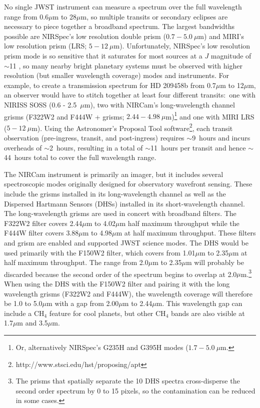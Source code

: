 \documentclass[iop]{emulateapj}
\newcommand{\SOSSrange}{0.6 - 2.5~$\mu$m}
\begin{document}
No single JWST instrument can measure a spectrum over the full wavelength range from 0.6$\mu$m to 28$\mu$m, so multiple transits or secondary eclipses are necessary to piece together a broadband spectrum.
The largest bandwidths possible are NIRSpec's low resolution double prism ($0.7-5.0~\mu$m) and MIRI's low resolution prism (LRS; $5-12~\mu$m).
Unfortunately, NIRSpec's low resolution prism mode is so sensitive that it saturates for most sources at a $J$ magnitude of $\sim$11 \citep{beichman2014pasp}, so many nearby bright planetary systems must be observed with higher resolution (but smaller wavelength coverage) modes and instruments.
For example, to create a transmission spectrum for HD 209458b \citep{henry00,charbonneau00} from 0.7$\mu$m to 12$\mu$m, an observer would have to stitch together at least four different transits:\ one with NIRISS SOSS (\SOSSrange), two with NIRCam's long-wavelength channel grisms (F322W2 and F444W + grisms; $2.44-4.98~\mu$m)\footnote{Or, alternatively NIRSpec's G235H and G395H modes ($1.7-5.0~\mu$m.} and one with MIRI LRS ($5-12~\mu$m).
Using the Astronomer's Proposal Tool software\footnote{http://www.stsci.edu/hst/proposing/apt}, each transit observation (pre-ingress, transit, and post-ingress) requires $\sim$9~hours and incurs overheads of $\sim$2~hours, resulting in a total of $\sim$11~hours per transit and hence $\sim$44~hours total to cover
the full wavelength range.

The NIRCam instrument is primarily an imager, but it includes several spectroscopic modes originally designed for observatory wavefront sensing.
These include the grisms installed in its long-wavelength channel as well as the Dispersed Hartmann Sensors (DHSs) installed in its short-wavelength channel.
The long-wavelength grisms are used in concert with broadband filters.
The F322W2 filter covers 2.44$\mu$m to 4.02$\mu$m half maximum throughput while the F444W filter covers 3.88$\mu$m to 4.98$\mu$m at half maximum throughput.
These filters and grism are enabled and supported JWST science modes.
The DHS would be used primarily with the F150W2 filter, which covers from 1.01$\mu$m to 2.35$\mu$m at half maximum throughput.
The range from 2.0$\mu$m to 2.35$\mu$m will probably be discarded because the second order of the spectrum begins to overlap at 2.0$\mu$m.\footnote{The prisms that spatially separate the 10 DHS spectra cross-disperse the second order spectrum by 0 to 15 pixels, so the contamination can be reduced in some cases.}
When using the DHS with the F150W2 filter and pairing it with the long wavelength grisms (F322W2 and F444W), the wavelength coverage will therefore be 1.0 to 5.0$\mu$m with a gap from 2.00$\mu$m to 2.44$\mu$m.
This wavelength gap can include a CH$_4$ feature for cool planets, but other CH$_4$ bands are also visible at 1.7$\mu$m and 3.5$\mu$m.
\end{document}
